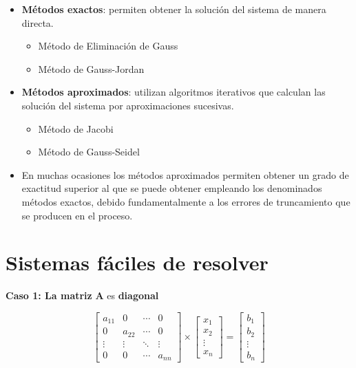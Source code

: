 \documentclass[openany]{book}
\providecommand{\tightlist}{%
  \setlength{\itemsep}{0pt}\setlength{\parskip}{0pt}}
\begin{document}
\begin{itemize}
\item
  \textbf{Métodos exactos}: permiten obtener la solución del sistema de manera directa.

  \begin{itemize}
  \tightlist
  \item
    Método de Eliminación de Gauss
  \item
    Método de Gauss-Jordan
  \end{itemize}
\item
  \textbf{Métodos aproximados}: utilizan algoritmos iterativos que calculan las solución del sistema por aproximaciones sucesivas.

  \begin{itemize}
  \tightlist
  \item
    Método de Jacobi
  \item
    Método de Gauss-Seidel
  \end{itemize}
\item
  En muchas ocasiones los métodos aproximados permiten obtener un grado de exactitud superior al que se puede obtener empleando los denominados métodos exactos, debido fundamentalmente a los errores de truncamiento que se producen en el proceso.
\end{itemize}

\hypertarget{sistemas-fuxe1ciles-de-resolver}{%
\section{Sistemas fáciles de resolver}\label{sistemas-fuxe1ciles-de-resolver}}

\textbf{Caso 1: La matriz} \(\mathbf{A}\) es \textbf{diagonal}

\[
\begin{bmatrix}
a_{11} & 0 & \cdots & 0 \\
0 & a_{22} & \cdots & 0 \\
\vdots & \vdots & \ddots & \vdots \\
0 & 0 & \cdots & a_{nn} 
\end{bmatrix}
\times 
\begin{bmatrix}
x_1 \\ x_2 \\ \vdots \\ x_n
\end{bmatrix}
=
\begin{bmatrix}
b_1 \\ b_2 \\ \vdots \\ b_n
\end{bmatrix}
\]
\end{document}
